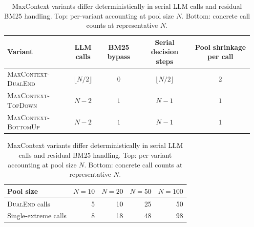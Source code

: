 \begin{table}[t]
\centering
\small
\caption{MaxContext variants differ deterministically in serial LLM calls and residual BM25 handling. Top: per-variant accounting at pool size $N$. Bottom: concrete call counts at representative $N$.}
\label{tab:call-accounting}
\begin{tabular}{lcccc}
\toprule
\textbf{Variant} & \textbf{LLM calls} & \textbf{BM25 bypass} & \textbf{Serial decision steps} & \textbf{Pool shrinkage per call} \\
\midrule
\textsc{MaxContext-DualEnd} & $\lfloor N/2 \rfloor$ & $0$ & $\lfloor N/2 \rfloor$ & $2$ \\
\textsc{MaxContext-TopDown} & $N{-}2$ & $1$ & $N{-}1$ & $1$ \\
\textsc{MaxContext-BottomUp} & $N{-}2$ & $1$ & $N{-}1$ & $1$ \\
\bottomrule
\end{tabular}

\vspace{0.6em}

\begin{tabular}{lrrrr}
\toprule
\textbf{Pool size} & $N{=}10$ & $N{=}20$ & $N{=}50$ & $N{=}100$ \\
\midrule
\textsc{DualEnd} calls & 5 & 10 & 25 & 50 \\
Single-extreme calls & 8 & 18 & 48 & 98 \\
\bottomrule
\end{tabular}
\end{table}
